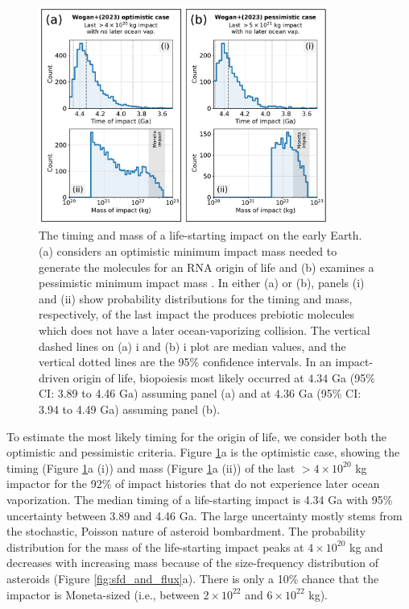 \documentclass[manuscript]{aastex63}
\begin{document}
\begin{figure}
  \centering
  \includegraphics[width=0.85\textwidth]{figures/timing_and_mass.pdf}
  \caption{The timing and mass of a life-starting impact on the early Earth. (a) considers an optimistic minimum impact mass needed to generate the molecules for an RNA origin of life and (b) examines a pessimistic minimum impact mass \citep{Wogan_2023}. In either (a) or (b), panels (i) and (ii) show probability distributions for the timing and mass, respectively, of the last impact the produces prebiotic molecules which does not have a later ocean-vaporizing collision. The vertical dashed lines on (a) i and (b) i plot are median values, and the vertical dotted lines are the 95\% confidence intervals. In an impact-driven origin of life, biopoiesis most likely occurred at $4.34$ Ga (95\% CI: 3.89 to 4.46 Ga) assuming panel (a) and at $4.36$ Ga (95\% CI: 3.94 to 4.49 Ga) assuming panel (b).}
  \label{fig:time_and_mass}
\end{figure}

To estimate the most likely timing for the origin of life, we consider both the \citet{Wogan_2023} optimistic and pessimistic criteria. Figure \ref{fig:time_and_mass}a is the optimistic case, showing the timing (Figure \ref{fig:time_and_mass}a (i)) and mass (Figure \ref{fig:time_and_mass}a (ii)) of the last $> 4 \times 10^{20}$ kg impactor for the 92\% of impact histories that do not experience later ocean vaporization. The median timing of a life-starting impact is 4.34 Ga with 95\% uncertainty between 3.89 and 4.46 Ga. The large uncertainty mostly stems from the stochastic, Poisson nature of asteroid bombardment. The probability distribution for the mass of the life-starting impact peaks at $4 \times 10^{20}$ kg and decreases with increasing mass because of the size-frequency distribution of asteroids (Figure \ref{fig:sfd_and_flux}a). There is only a 10\% chance that the impactor is Moneta-sized (i.e., between $2 \times 10^{22}$ and $6 \times 10^{22}$ kg).
\end{document}
